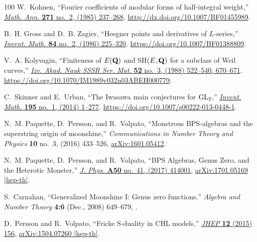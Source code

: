 \begin{thebibliography}{100}
W.~Kohnen, ``Fourier coefficients of modular forms of half-integral weight,''
  \href{http://dx.doi.org/10.1007/BF01455989}{{\em Math. Ann.} {\bfseries 271}
  no.~2, (1985) 237--268}. \url{http://dx.doi.org/10.1007/BF01455989}.

B.~H. Gross and D.~B. Zagier, ``Heegner points and derivatives of
  {$L$}-series,'' \href{http://dx.doi.org/10.1007/BF01388809}{{\em Invent.
  Math.} {\bfseries 84} no.~2, (1986) 225--320}.
  \url{https://doi.org/10.1007/BF01388809}.

V.~A. Kolyvagin, ``Finiteness of {$E({\bf Q})$} and {{SH}}{$(E,{\bf Q})$} for a
  subclass of {W}eil curves,''
  \href{http://dx.doi.org/10.1070/IM1989v032n03ABEH000779}{{\em Izv. Akad. Nauk
  SSSR Ser. Mat.} {\bfseries 52} no.~3, (1988) 522--540, 670--671}.
  \url{https://doi.org/10.1070/IM1989v032n03ABEH000779}.

C.~Skinner and E.~Urban, ``The {I}wasawa main conjectures for {$\rm GL_2$},''
  \href{http://dx.doi.org/10.1007/s00222-013-0448-1}{{\em Invent. Math.}
  {\bfseries 195} no.~1, (2014) 1--277}.
  \url{https://doi.org/10.1007/s00222-013-0448-1}.

N.~M. Paquette, D.~Persson, and R.~Volpato, ``{Monstrous BPS-algebras and the
  superstring origin of moonshine},'' {\em Communications in Number Theory and
  Physics} {\bfseries 10} no.~3, (2016) 433--526,
  \href{http://arxiv.org/abs/arXiv:1601.05412}{{\ttfamily arXiv:1601.05412}}.

N.~M. Paquette, D.~Persson, and R.~Volpato, ``{BPS Algebras, Genus Zero, and
  the Heterotic Monster},''
  \href{http://dx.doi.org/10.1088/1751-8121/aa8443}{{\em J. Phys.} {\bfseries
  A50} no.~41, (2017) 414001},
\href{http://arxiv.org/abs/1701.05169}{{\ttfamily arXiv:1701.05169 [hep-th]}}.

S.~Carnahan, ``{Generalized Moonshine I: Genus zero functions},'' {\em Algebra
  and Number Theory} {\bfseries 4:6} (Dec., 2008) 649--679,
  \href{http://arxiv.org/abs/0812.3440}{{}}.

D.~Persson and R.~Volpato, ``{Fricke S-duality in CHL models},''
  \href{http://dx.doi.org/10.1007/JHEP12(2015)156}{{\em JHEP} {\bfseries 12}
  (2015) 156},
\href{http://arxiv.org/abs/1504.07260}{{\ttfamily arXiv:1504.07260 [hep-th]}}.


\end{thebibliography}
